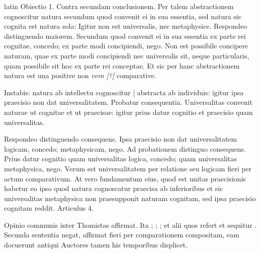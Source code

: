 \begin{otherlanguage*}{latin}
\pstart
Obiectio 1. Contra secundam conclusionem. Per talem abstractionem cognoscitur natura secundum quod convenit ei in sua essentia, sed natura sic cognita est natura sola:
Igitur non est universalis, nec metaphysice. Respondeo distinguendo maiorem. Secundum quod convenit ei in sua essentia ex parte rei cognitae, concedo; ex parte modi concipiendi, nego. Non est possibile concipere naturam, quae ex parte modi concipiendi nec universalis sit, neque particularis, quam possibile sit hoc ex parte rei conceptae. Et sic per hanc abstractionem natura est una positive non \emph{vero [?]} comparative. 
\pend

\pstart
Instabis:
natura ab intellectu cognoscitur \textnormal{|} abstracta ab individuis:
igitur ipsa praecisio non dat universalitatem. Probatur consequentia. Universalitas convenit naturae ut cognitae et ut praecisae:
igitur prius datur cognitio et praecisio quam universalitas. 
\pend

\pstart
Respondeo distinguendo consequens. Ipsa praecisio non dat universalitatem logicam, concedo; metaphysicam, nego. Ad probationem distinguo consequens. Prius datur cognitio quam universalitas logica, concedo; quam universalitas metaphysica, nego. Verum est universalitatem per relatione seu logicam fieri per actum comparativum. At vero fundamentum eius, quod est unitas praecisionis habetur eo ipso quod natura cognoscatur praecisa ab inferioribus et sic universalitas metaphysica non praesupponit naturam cognitam, sed ipsa praecisio cognitam reddit. Articulus 4. 
\pend

\pstart
{}
\pend

\pstart
Opinio communis inter Thomistas affirmat. Ita ; ; ;  et alii quos refert et sequitur . Secunda sententia negat, affirmat fieri per comparationem compositam, eam docuerunt antiqui Auctores tamen his temporibus displicet. 
\pend


\end{otherlanguage*}
